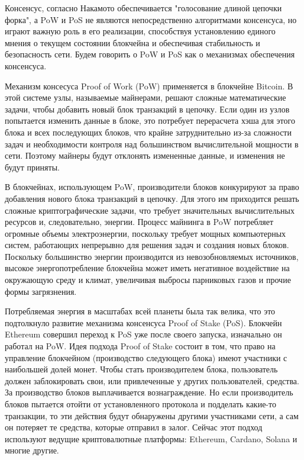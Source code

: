 Консенсус, согласно Накамото обеспечивается "голосование длиной цепочки форка", а PoW и PoS не являются непосредственно алгоритмами консенсуса, но играют важную роль в его реализации, способствуя установлению единого мнения о текущем состоянии блокчейна и обеспечивая стабильность и безопасность сети\cite{label19}. Будем говорить о PoW и PoS как о механизмах обеспечения консенсуса.

Механизм консесуса Proof of Work (PoW) применяется в блокчейне Bitcoin. В этой системе узлы, называемые майнерами, решают сложные математические задачи, чтобы добавить новый блок транзакций в цепочку. Если один из узлов попытается изменить данные в блоке, это потребует перерасчета хэша для этого блока и всех последующих блоков, что крайне затруднительно из-за сложности задач и необходимости контроля над большинством вычислительной мощности в сети. Поэтому майнеры будут отклонять измененные данные, и изменения не будут приняты.

В блокчейнах, использующем PoW, производители блоков конкурируют за право добавления нового блока транзакций в цепочку. Для этого им приходится решать сложные криптографические задачи, что требует значительных вычислительных ресурсов и, следовательно, энергии. Процесс майнинга в PoW потребляет огромные объемы электроэнергии, поскольку требует мощных компьютерных систем, работающих непрерывно для решения задач и создания новых блоков. Поскольку большинство энергии производится из невозобновляемых источников, высокое энергопотребление блокчейна может иметь негативное воздействие на окружающую среду и климат, увеличивая выбросы парниковых газов и прочие формы загрязнения.

Потребляемая энергия в масштабах всей планеты была так велика, что это подтолкнуло развитие механизма консенсуса Proof of Stake (PoS). Блокчейн Ethereum совершил переход к PoS уже после своего запуска, изначально он работал на PoW. Идея подхода Proof of Stake состоит в том, что право на управление блокчейном (производство следующего блока) имеют участники с наибольшей долей монет. Чтобы стать производителем блока, пользователь должен заблокировать свои, или привлеченные у других пользователей, средства. За производство блоков выплачивается вознаграждение. Но если производитель блоков пытается отойти от установленного протокола и подделать какие-то транзакции, то эти действия будут обнаружены другими участниками сети, а сам он потеряет те средства, которые отправил в залог. Сейчас этот подход используют ведущие криптовалютные платформы: Ethereum, Cardano, Solana и многие другие.

